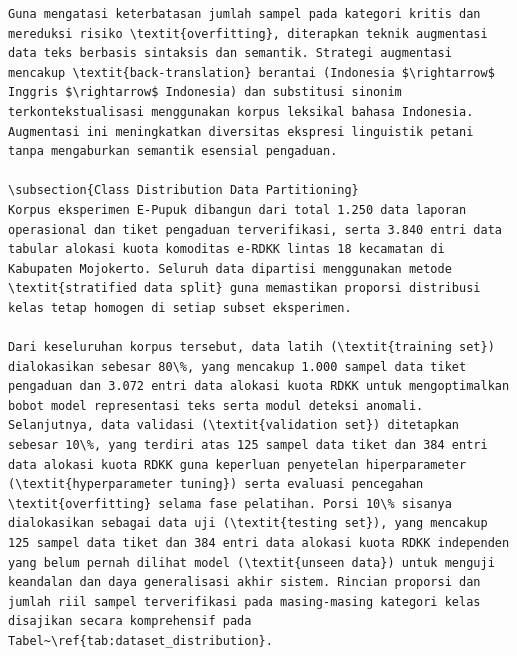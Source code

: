 \documentclass[conference]{IEEEtran}
\begin{document}
\begin{lstlisting}
Guna mengatasi keterbatasan jumlah sampel pada kategori kritis dan mereduksi risiko \textit{overfitting}, diterapkan teknik augmentasi data teks berbasis sintaksis dan semantik. Strategi augmentasi mencakup \textit{back-translation} berantai (Indonesia $\rightarrow$ Inggris $\rightarrow$ Indonesia) dan substitusi sinonim terkontekstualisasi menggunakan korpus leksikal bahasa Indonesia. Augmentasi ini meningkatkan diversitas ekspresi linguistik petani tanpa mengaburkan semantik esensial pengaduan.

\subsection{Class Distribution Data Partitioning}
Korpus eksperimen E-Pupuk dibangun dari total 1.250 data laporan operasional dan tiket pengaduan terverifikasi, serta 3.840 entri data tabular alokasi kuota komoditas e-RDKK lintas 18 kecamatan di Kabupaten Mojokerto. Seluruh data dipartisi menggunakan metode \textit{stratified data split} guna memastikan proporsi distribusi kelas tetap homogen di setiap subset eksperimen.

Dari keseluruhan korpus tersebut, data latih (\textit{training set}) dialokasikan sebesar 80\%, yang mencakup 1.000 sampel data tiket pengaduan dan 3.072 entri data alokasi kuota RDKK untuk mengoptimalkan bobot model representasi teks serta modul deteksi anomali. Selanjutnya, data validasi (\textit{validation set}) ditetapkan sebesar 10\%, yang terdiri atas 125 sampel data tiket dan 384 entri data alokasi kuota RDKK guna keperluan penyetelan hiperparameter (\textit{hyperparameter tuning}) serta evaluasi pencegahan \textit{overfitting} selama fase pelatihan. Porsi 10\% sisanya dialokasikan sebagai data uji (\textit{testing set}), yang mencakup 125 sampel data tiket dan 384 entri data alokasi kuota RDKK independen yang belum pernah dilihat model (\textit{unseen data}) untuk menguji keandalan dan daya generalisasi akhir sistem. Rincian proporsi dan jumlah riil sampel terverifikasi pada masing-masing kategori kelas disajikan secara komprehensif pada Tabel~\ref{tab:dataset_distribution}.


\end{lstlisting}
\end{document}
